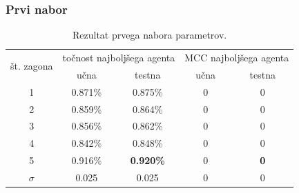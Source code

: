 \subsubsection{Prvi nabor}
\begin{table}[H]
    \caption{Rezultat prvega nabora parametrov.}
    \begin{center}
        \begin{tabular}{|| c | c c || c c ||}
            \hline
            \multirow{2}{*}{št. zagona} & \multicolumn{2}{c||}{točnost najboljšega agenta} & \multicolumn{2}{c||}{MCC najboljšega agenta} \\ \cline{2-5}
            & učna    & testna           & učna  & testna         \\
            \hline
            1        & 0.871\% & 0.875\% & 0 & 0          \\
            \hline
            2        & 0.859\% & 0.864\%          & 0 & 0          \\
            \hline
            3        & 0.856\% & 0.862\%          & 0 & 0          \\
            \hline
            4        & 0.842\% & 0.848\%          & 0 & 0          \\
            \hline
            5        & 0.916\% & \textbf{0.920\%}          & 0 & \textbf{0} \\
            \hline
            $\sigma$ & 0.025   & 0.025            & 0 & 0          \\
            \hline
        \end{tabular}
    \end{center}
    \label{tab:statlog_result_1}
\end{table}

